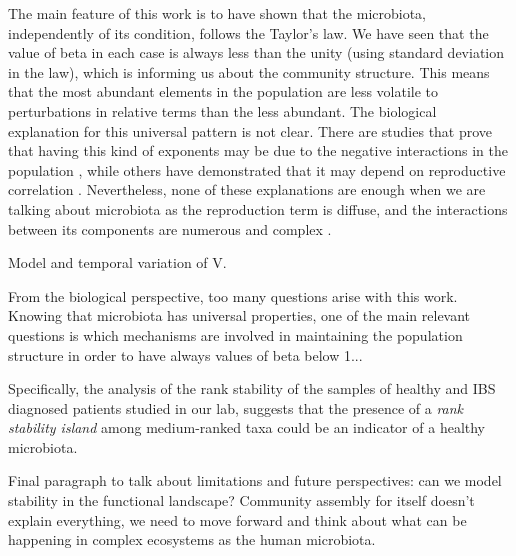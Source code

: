
The main feature of this work is to have shown that the microbiota, independently of its condition, follows the Taylor's law. We have seen that the value of beta in each case is always less than the unity (using standard deviation in the law), which is informing us about the community structure. This means that the most abundant elements in the population are less volatile to perturbations in relative terms than the less abundant. The biological explanation for this universal pattern is not clear. There are studies that prove that having this kind of exponents may be due to the negative interactions in the population \cite{kilpatrick}, while others have demonstrated that it may depend on reproductive correlation \cite{ballantyne}. Nevertheless, none of these explanations are enough when we are talking about microbiota as the reproduction term is diffuse, and the interactions between its components are numerous and complex \cite{joao, mehta}.

Model and temporal variation of V.

From the biological perspective, too many questions arise with this work. Knowing that microbiota has universal properties, one of the main relevant questions is which mechanisms are involved in maintaining the population structure in order to have always values of beta below 1...

Specifically, the analysis of the rank stability of the samples of healthy and IBS diagnosed patients studied in our lab\cite{IBS}, suggests that the presence of a \emph{rank stability island} among medium-ranked taxa could be an indicator of a healthy microbiota. 

Final paragraph to talk about limitations and future perspectives: can we model stability in the functional landscape? Community assembly for itself doesn't explain everything, we need to move forward and think about what can be happening in complex ecosystems as the human microbiota.